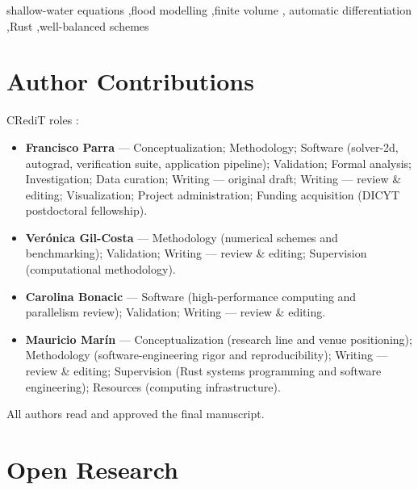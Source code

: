 \documentclass[preprint,review,12pt,authoryear]{elsarticle}
\begin{document}
\begin{frontmatter}
\begin{keyword}
shallow-water equations \sep flood modelling \sep finite volume \sep
automatic differentiation \sep Rust \sep well-balanced schemes
\end{keyword}

\end{frontmatter}

\linenumbers





\section*{Author Contributions}

CRediT roles \citep{Brand2015}:

\begin{itemize}
\item \textbf{Francisco Parra} --- Conceptualization; Methodology;
  Software (solver-2d, autograd, verification suite, application
  pipeline); Validation; Formal analysis; Investigation; Data
  curation; Writing --- original draft; Writing --- review \&
  editing; Visualization; Project administration; Funding acquisition
  (DICYT postdoctoral fellowship).
\item \textbf{Verónica Gil-Costa} --- Methodology (numerical schemes
  and benchmarking); Validation; Writing --- review \& editing;
  Supervision (computational methodology).
\item \textbf{Carolina Bonacic} --- Software (high-performance
  computing and parallelism review); Validation; Writing --- review
  \& editing.
\item \textbf{Mauricio Marín} --- Conceptualization (research line
  and venue positioning); Methodology (software-engineering rigor
  and reproducibility); Writing --- review \& editing; Supervision
  (Rust systems programming and software engineering); Resources
  (computing infrastructure).
\end{itemize}

All authors read and approved the final manuscript.

\section*{Open Research}
\end{document}
